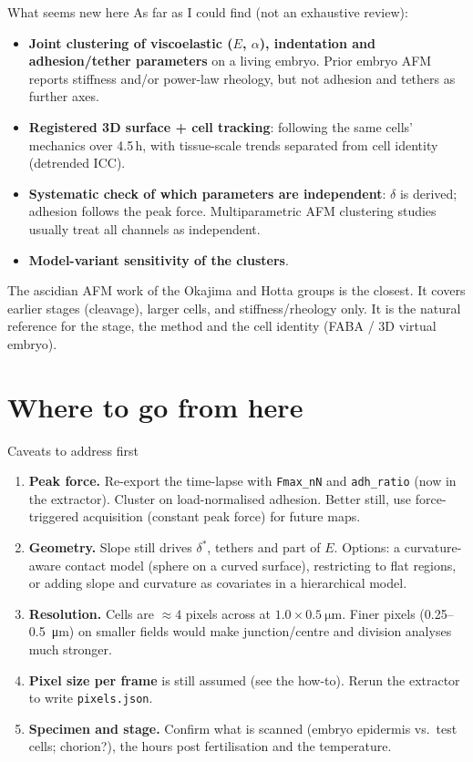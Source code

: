 \documentclass[aspectratio=169,9pt]{beamer}
\begin{document}
\begin{frame}{What seems new here}
\footnotesize
As far as I could find (not an exhaustive review):
\begin{itemize}
\item \textbf{Joint clustering of viscoelastic ($E$, $\alpha$), indentation and adhesion/tether parameters} on a living embryo. Prior embryo AFM reports stiffness and/or power-law rheology, but not adhesion and tethers as further axes.
\item \textbf{Registered 3D surface + cell tracking}: following the same cells' mechanics over 4.5\,h, with tissue-scale trends separated from cell identity (detrended ICC).
\item \textbf{Systematic check of which parameters are independent}: $\delta$ is derived; adhesion follows the peak force. Multiparametric AFM clustering studies usually treat all channels as independent.
\item \textbf{Model-variant sensitivity of the clusters}.
\end{itemize}
The ascidian AFM work of the Okajima and Hotta groups is the closest. It covers earlier stages (cleavage), larger cells, and stiffness/rheology only. It is the natural reference for the stage, the method and the cell identity (FABA / 3D virtual embryo).
\end{frame}

\section{Where to go from here}

\begin{frame}{Caveats to address first}
\footnotesize
\begin{enumerate}
\item \textbf{Peak force.} Re-export the time-lapse with \texttt{Fmax\_nN} and \texttt{adh\_ratio} (now in the extractor). Cluster on load-normalised adhesion. Better still, use force-triggered acquisition (constant peak force) for future maps.
\item \textbf{Geometry.} Slope still drives $\delta^*$, tethers and part of $E$. Options: a curvature-aware contact model (sphere on a curved surface), restricting to flat regions, or adding slope and curvature as covariates in a hierarchical model.
\item \textbf{Resolution.} Cells are $\approx4$ pixels across at $1.0\times\SI{0.5}{\micro\metre}$. Finer pixels (0.25--\SI{0.5}{\micro\metre}) on smaller fields would make junction/centre and division analyses much stronger.
\item \textbf{Pixel size per frame} is still assumed (see the how-to). Rerun the extractor to write \texttt{pixels.json}.
\item \textbf{Specimen and stage.} Confirm what is scanned (embryo epidermis vs.\ test cells; chorion?), the hours post fertilisation and the temperature.
\end{enumerate}
\end{frame}
\end{document}
